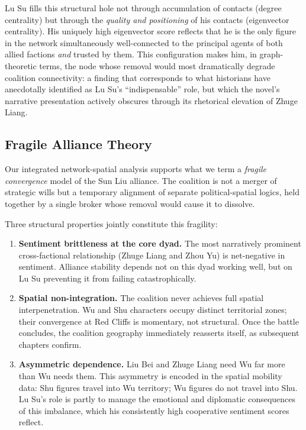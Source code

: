 \documentclass[12pt, a4paper]{article}
\begin{document}
Lu Su fills this structural hole not through accumulation of contacts
(degree centrality) but through the \emph{quality and positioning} of
his contacts (eigenvector centrality).
His uniquely high eigenvector score reflects that he is the only figure
in the network simultaneously well-connected to the principal agents of
both allied factions \emph{and} trusted by them.
This configuration makes him, in graph-theoretic terms, the node whose
removal would most dramatically degrade coalition connectivity: a
finding that corresponds to what historians have anecdotally identified
as Lu Su's ``indispensable'' role, but which the novel's narrative
presentation actively obscures through its rhetorical elevation of
Zhuge Liang.

\subsection{Fragile Alliance Theory}

Our integrated network-spatial analysis supports what we term a
\emph{fragile convergence} model of the Sun Liu alliance.
The coalition is not a merger of strategic wills but a temporary alignment
of separate political-spatial logics, held together by a single broker
whose removal would cause it to dissolve.

Three structural properties jointly constitute this fragility:

\begin{enumerate}
  \item \textbf{Sentiment brittleness at the core dyad.}
        The most narratively prominent cross-factional relationship
        (Zhuge Liang and Zhou Yu) is net-negative in sentiment.
        Alliance stability depends not on this dyad working well,
        but on Lu Su preventing it from failing catastrophically.

  \item \textbf{Spatial non-integration.}
        The coalition never achieves full spatial interpenetration.
        Wu and Shu characters occupy distinct territorial zones;
        their convergence at Red Cliffs is momentary, not structural.
        Once the battle concludes, the coalition geography immediately
        reasserts itself, as subsequent chapters confirm.

  \item \textbf{Asymmetric dependence.}
        Liu Bei and Zhuge Liang need Wu far more than Wu needs them.
        This asymmetry is encoded in the spatial mobility data:
        Shu figures travel into Wu territory; Wu figures do not
        travel into Shu.
        Lu Su's role is partly to manage the emotional and diplomatic
        consequences of this imbalance, which his consistently high
        cooperative sentiment scores reflect.
\end{enumerate}
\end{document}
